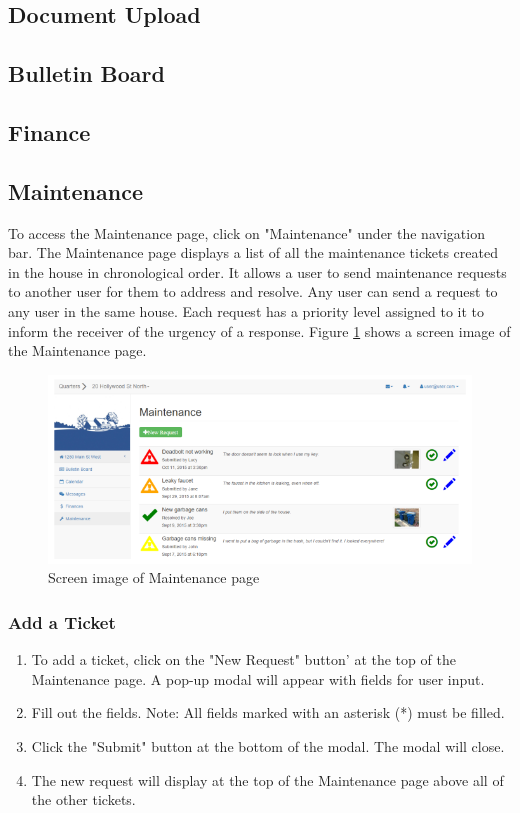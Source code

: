 \documentclass[12pt]{article}
\begin{document}
\subsection{Document Upload}

\subsection{Bulletin Board}

\subsection{Finance}

\subsection{Maintenance}
To access the Maintenance page, click on "Maintenance" under the navigation bar. The Maintenance page displays a list of all the maintenance tickets created in the house in chronological order. It  allows a user to send maintenance requests to another user for them to address and resolve. Any user can send a request to any user in the same house. Each request has a priority level assigned to it to inform the receiver of the urgency of a response. Figure \ref{fig:maintenance} shows a screen image of the Maintenance page.

\begin{figure}
\centering
\includegraphics[width=\textwidth]{maintenance}
\caption{Screen image of Maintenance page}
\label{fig:maintenance}
\end{figure}

\subsubsection{Add a Ticket}
\begin{enumerate}
\item To add a ticket, click on the "New Request" button' at the top of the Maintenance page. A pop-up modal will appear with fields for user input.
\item Fill out the fields. Note: All fields marked with an asterisk (*) must be filled.
\item Click the "Submit" button at the bottom of the modal. The modal will close.
\item The new request will display at the top of the Maintenance page above all of the other tickets.
\end{enumerate}
\end{document}
